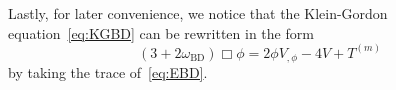 Lastly, for later convenience, we notice that the Klein-Gordon equation~\eqref{eq:KGBD} can be rewritten in the form~\cite{Quiros:2019ktw}
\begin{equation}\label{eq:KGBD2}
   \left(3+2\omega_{\mathrm{BD}}\right) \Box \phi = 2 \phi V_{,\phi} -4 V + T^{(m)}
\end{equation}
by taking the trace of~\eqref{eq:EBD}.